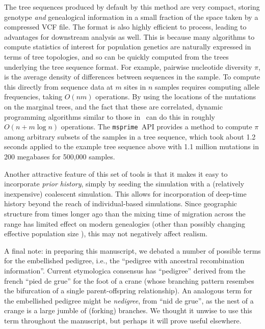 \documentclass{article}
\newcommand{\msprime}{\texttt{msprime}}
\begin{document}
The tree sequences produced by default by this method
are very compact, storing genotype \emph{and} genealogical information
in a small fraction of the space taken by a compressed VCF file.
The format is also highly efficient to process,
leading to advantages for downstream analysis as well.
This is because many algorithms to compute statistics of interest for population genetics
are naturally expressed in terms of tree topologies,
and so can be quickly computed from the trees underlying the tree sequence format. 
For example, pairwise nucleotide diversity $\pi$, is the average density of
differences between sequences in the sample. 
To compute this directly from sequence data at $m$ sites in $n$ samples
requires computing allele frequencies, taking $O(nm)$ operations.
By using the locations of the mutations on the marginal trees,
and the fact that these are correlated, 
dynamic programming algorithms similar to those in~\citep{kelleher2016efficient}
can do this in roughly $O(n + m \log n)$ operations.
The \msprime\ API provides a method to compute $\pi$ among arbitrary subsets of the
samples in a tree sequence, which took about 1.2 seconds
applied to the example tree sequence above with 1.1 million mutations 
in 200 megabases for 500,000 samples.

Another attractive feature of this set of tools
is that it makes it easy to incorporate \emph{prior history},
simply by seeding the simulation with a (relatively inexpensive) coalescent simulation.
This allows for incorporation of deep-time history beyond the reach of individual-based simulations. 
Since geographic structure from times longer ago than the mixing
time of migration across the range has limited effect on modern genealogies
\citep{wilkins2004separation} (other than possibly changing effective population
size \citet{barton2002neutral,cox2002stepping}), this may not negatively affect realism.


A final note:
in preparing this manuscript, 
we debated a number of possible terms for the embellished pedigree,
i.e., the ``pedigree with ancestral recombination information''.
Current etymologica consensus \citep{liberman2014little} has
``pedigree'' derived from the french ``pied de grue'' for the foot of a crane
(whose branching pattern resembes the bifurcation of a single parent-offspring relationship).
An analogous term for the embellished pedigree might be \emph{nedigree},
from ``nid de grue'',
as the nest of a crange is a large jumble of (forking) branches.
We thought it unwise to use this term throughout the manuscript,
but perhaps it will prove useful elsewhere.
\end{document}
